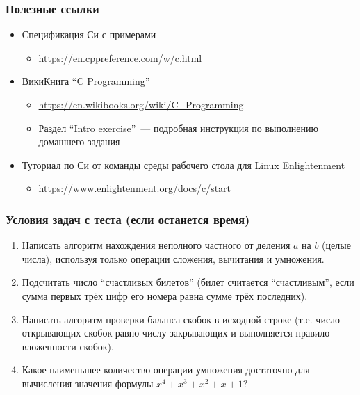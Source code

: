 \documentclass[aspectratio=169]{beamer}
\begin{document}
\begin{frame}
    \frametitle{Полезные ссылки}

    \begin{itemize}
        \item Спецификация Си с примерами
              \begin{itemize}
                  \item \url{https://en.cppreference.com/w/c.html}
              \end{itemize}
        \item ВикиКнига \enquote{C Programming}
              \begin{itemize}
                  \item \url{https://en.wikibooks.org/wiki/C_Programming}
                  \item Раздел \enquote{Intro exercise}~--- подробная инструкция по выполнению домашнего задания
              \end{itemize}
        \item Туториал по Си от команды среды рабочего стола для Linux Enlightenment
              \begin{itemize}
                  \item \url{https://www.enlightenment.org/docs/c/start}
              \end{itemize}
    \end{itemize}
\end{frame}

\appendix
\begin{frame}
    \frametitle{Условия задач с теста (если останется время)}
    \begin{enumerate}
        \item Написать алгоритм нахождения неполного частного от деления $a$ на $b$ (целые числа), используя только операции сложения, вычитания и умножения.
        \item Подсчитать число \enquote{счастливых билетов} (билет считается \enquote{счастливым}, если сумма первых трёх цифр его номера равна сумме трёх последних).
        \item Написать алгоритм проверки баланса скобок в исходной строке (т.е. число открывающих скобок равно числу закрывающих и выполняется правило вложенности скобок).
        \item Какое наименьшее количество операции умножения достаточно для вычисления значения формулы $x^4 + x^3 + x^2 + x + 1$?
    \end{enumerate}
\end{frame}
\end{document}
